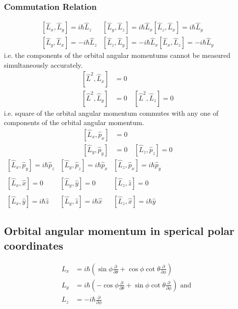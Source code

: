\subsubsection{Commutation Relation}
\begin{align*}
{\left[\hat{L}_{x}, \hat{L}_{y}\right]=i \hbar \hat{L}_{z}} & {\left[\hat{L}_{y}, \hat{L}_{z}\right]=i \hbar \hat{L}_{x}} {\left[\hat{L}_{z}, \hat{L}_{x}\right]=i \hbar \hat{L}_{y}} \\
{\left[\hat{L}_{y}, \hat{L}_{x}\right]=-i \hbar \hat{L}_{z}} & {\left[\hat{L}_{z}, \hat{L}_{y}\right]=-i \hbar \hat{L}_{x}}  {\left[\hat{L}_{x}, \hat{L}_{z}\right]=-i \hbar \hat{L}_{y}}
\end{align*}
i.e. the components of the orbital angular momentums cannot be measured simultaneously accurately.
\begin{align*}
\left[\hat{L}^{2}, \hat{L}_{x}\right]&=0\\
\left[\hat{L}^{2}, \hat{L}_{y}\right]&=0 \quad\left[\hat{L}^{2}, \hat{L}_{z}\right]=0
\end{align*}
i.e. square of the orbital angular momentum commutes with any one of components of the orbital angular momentum.
\begin{align*}
\left[\hat{L}_{x}, \hat{p}_{x}\right]&=0\\
\left[\hat{L}_{y}, \hat{p}_{y}\right]&=0 \quad\left[\hat{L}_{z}, \hat{p}_{z}\right]=0
\end{align*}
$\begin{array}{lll}
	{\left[\hat{L}_{x}, \hat{p}_{y}\right]=i \hbar \hat{p}_{z}}  & {\left[\hat{L}_{y}, \hat{p}_{z}\right]=i \hbar \hat{p}_{x}} & {\left[\hat{L}_{z}, \hat{p}_{x}\right]=i \hbar \hat{p}_{y}} \\\\
	{\left[\hat{L}_{x}, \hat{x}\right]=0} & {\left[\hat{L}_{y}, \hat{y}\right]=0} & {\left[\hat{L}_{z}, \hat{z}\right]=0} \\\\
	{\left[\hat{L}_{x}, \hat{y}\right]=i \hbar \hat{z}} & {\left[\hat{L}_{y}, \hat{z}\right]=i \hbar \hat{x}} & {\left[\hat{L}_{z}, \hat{x}\right]=i \hbar \hat{y}}
\end{array}$
\subsection{Orbital angular momentum in sperical polar coordinates }
\begin{align*}
L_{x}&=i\hbar\left(\sin \phi \frac{\partial}{\partial \theta}+\cos \phi \cot \theta \frac{\partial}{\partial \phi}\right) \\
L_{y}&=i \hbar\left(-\cos \phi \frac{\partial}{\partial \theta}+\sin \phi \cot \theta \frac{\partial}{\partial \phi}\right) \text { and }\\
L_{z}&=-i \hbar \frac{\partial}{\partial \phi}
\end{align*}
